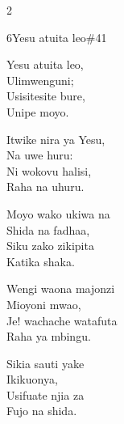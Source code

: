 \documentclass{article}
\begin{document}
\begin{multicols}{2}
\begin{hymn}{6}{Yesu atuita leo}{\#41}
\begin{stanza}
Yesu atuita leo,\\
Ulimwenguni;\\
Usisitesite bure,\\
Unipe moyo.
\end{stanza}
\begin{chorus}
Itwike nira ya Yesu,\\
Na uwe huru:\\
Ni wokovu halisi,\\
Raha na uhuru.
\end{chorus}
\begin{stanza}
Moyo wako ukiwa na\\
Shida na fadhaa,\\
Siku zako zikipita\\
Katika shaka.
\end{stanza}
\begin{stanza}
Wengi waona majonzi\\
Mioyoni mwao,\\
Je! wachache watafuta\\
Raha ya mbingu.
\end{stanza}
\begin{stanza}
Sikia sauti yake\\
Ikikuonya,\\
Usifuate njia za\\
Fujo na shida.
\end{stanza}
\end{hymn}


\end{multicols}
\end{document}
